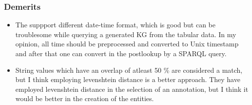 \documentclass[runningheads]{llncs}
\begin{document}
\subsubsection*{Demerits}
\begin{itemize}
    \item The suppport different date-time format, which is good but can be troublesome while querying a generated KG from the tabular data. In my opinion, all time should be preprocessed and converted to Unix timestamp and after that one can convert in the postlookup by a SPARQL query.
    \item String values which have an overlap of atleast 50 \% are considered a match, but I think employing levenshtein distance is a better approach. They have employed levenshtein distance in the selection of an annotation, but I think it would be better in the creation of the entities.
\end{itemize}
\end{document}
